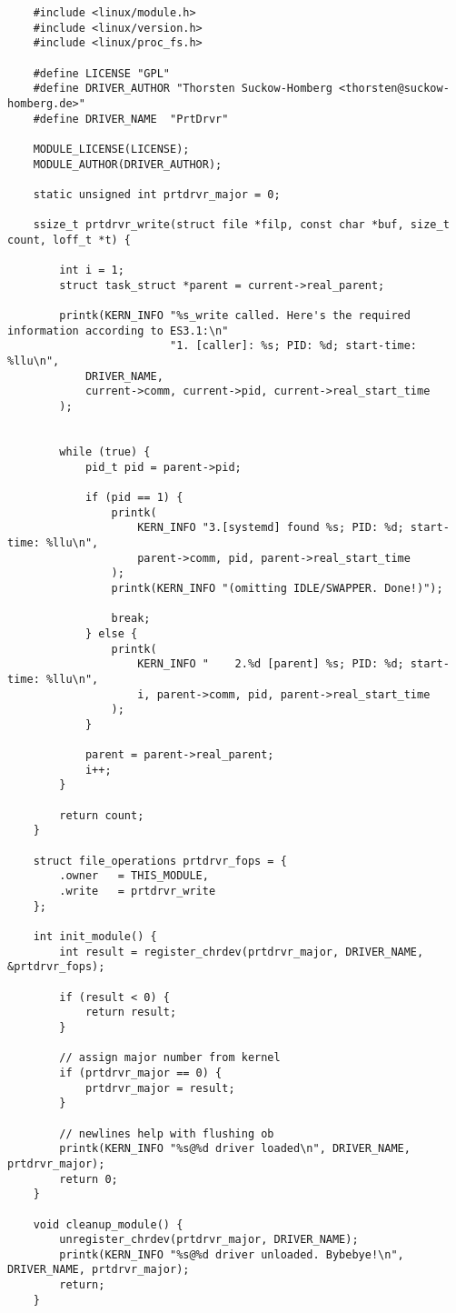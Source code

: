 \begin{verbatim}
    #include <linux/module.h>
    #include <linux/version.h>
    #include <linux/proc_fs.h>

    #define LICENSE "GPL"
    #define DRIVER_AUTHOR "Thorsten Suckow-Homberg <thorsten@suckow-homberg.de>"
    #define DRIVER_NAME  "PrtDrvr"

    MODULE_LICENSE(LICENSE);
    MODULE_AUTHOR(DRIVER_AUTHOR);

    static unsigned int prtdrvr_major = 0;

    ssize_t prtdrvr_write(struct file *filp, const char *buf, size_t count, loff_t *t) {

        int i = 1;
        struct task_struct *parent = current->real_parent;

        printk(KERN_INFO "%s_write called. Here's the required  information according to ES3.1:\n"
                         "1. [caller]: %s; PID: %d; start-time: %llu\n",
            DRIVER_NAME,
            current->comm, current->pid, current->real_start_time
        );


        while (true) {
            pid_t pid = parent->pid;

            if (pid == 1) {
                printk(
                    KERN_INFO "3.[systemd] found %s; PID: %d; start-time: %llu\n",
                    parent->comm, pid, parent->real_start_time
                );
                printk(KERN_INFO "(omitting IDLE/SWAPPER. Done!)");

                break;
            } else {
                printk(
                    KERN_INFO "    2.%d [parent] %s; PID: %d; start-time: %llu\n",
                    i, parent->comm, pid, parent->real_start_time
                );
            }

            parent = parent->real_parent;
            i++;
        }

        return count;
    }

    struct file_operations prtdrvr_fops = {
        .owner   = THIS_MODULE,
        .write   = prtdrvr_write
    };

    int init_module() {
        int result = register_chrdev(prtdrvr_major, DRIVER_NAME, &prtdrvr_fops);

        if (result < 0) {
            return result;
        }

        // assign major number from kernel
        if (prtdrvr_major == 0) {
            prtdrvr_major = result;
        }

        // newlines help with flushing ob
        printk(KERN_INFO "%s@%d driver loaded\n", DRIVER_NAME, prtdrvr_major);
        return 0;
    }

    void cleanup_module() {
        unregister_chrdev(prtdrvr_major, DRIVER_NAME);
        printk(KERN_INFO "%s@%d driver unloaded. Bybebye!\n", DRIVER_NAME, prtdrvr_major);
        return;
    }
\end{verbatim}\\


